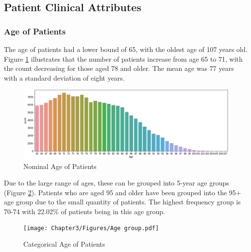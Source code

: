 \documentclass[../thesis.tex]{subfiles}
\begin{document}
\subsection{Patient Clinical Attributes}
\subsubsection{Age of Patients}
The age of patients had a lower bound of 65, with the oldest age of 107 years old. Figure \ref{Fig:Age} illustrates that the number of patients increase from age 65 to 71, with the count decreasing for those aged 78 and older. The mean age was 77 years with a standard deviation of eight years.

\begin{figure}[H]
    \centering
    \includegraphics[width=\textwidth]{Chapter3/Figures/Age.pdf}
    \caption{Nominal Age of Patients}
    \label{Fig:Age}
\end{figure}
Due to the large range of ages, these can be grouped into 5-year age groups (Figure \ref{Fig:AgeGroup}). Patients who are aged 95 and older have been grouped into the 95+ age group due to the small quantity of patients. The highest frequency group is 70-74 with 22.02\% of patients being in this age group.
\begin{figure}[H]
    \centering
    \texttt{[image: Chapter3/Figures/Age group.pdf]}
    \caption{Categorical Age of Patients}
    \label{Fig:AgeGroup}
\end{figure}
\end{document}
